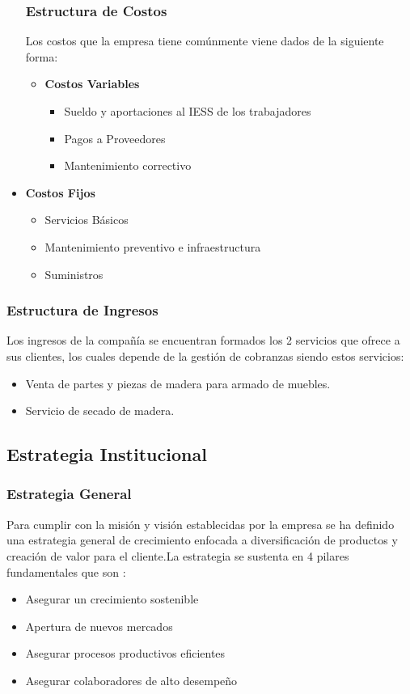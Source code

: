 \documentclass[12pt, a4paper]{article}
\begin{document}
\begin{itemize}
\subsubsection{Estructura de Costos}
Los costos que la empresa tiene comúnmente viene dados de la siguiente forma:
\begin {itemize}
	\item \textbf {Costos Variables}
		\begin {itemize}
			\item Sueldo y aportaciones al IESS de los trabajadores	
			\item Pagos a Proveedores 
			\item Mantenimiento correctivo
			\end{itemize}

\end{itemize}		
	\item \textbf {Costos Fijos}
		\begin {itemize}
			\item Servicios Básicos
			\item Mantenimiento preventivo e infraestructura
			\item Suministros 
			\end{itemize}
		\end{itemize}
\subsubsection{Estructura de Ingresos}

Los ingresos de la compañía se encuentran formados los 2 servicios   que ofrece a sus clientes, los cuales  depende de la gestión de cobranzas siendo estos servicios:
\begin {itemize}
	\item Venta  de partes y piezas de madera para armado de muebles.
	\item Servicio de secado de madera.
\end{itemize}

\subsection{Estrategia Institucional}
\subsubsection{Estrategia General}
Para cumplir con la misión y visión establecidas por la empresa se ha definido una estrategia general de crecimiento enfocada a diversificación de productos y creación de valor para el cliente.La estrategia se sustenta en  4 pilares fundamentales que son :
\begin{itemize}
	\item  Asegurar un crecimiento sostenible 
	\item  Apertura de nuevos mercados
	 \item Asegurar procesos productivos eficientes
	\item Asegurar colaboradores de alto desempeño
\end{itemize}
\end{document}
